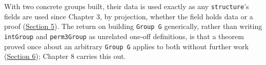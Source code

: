 With two concrete groups built, their data is used exactly as any \texttt{structure}'s fields are used since Chapter 3, by projection, whether the field holds data or a proof (\hyperref[sec:07-groups:05-accessing-fields:1]{Section 5}). The return on building \texttt{Group G} generically, rather than writing \texttt{intGroup} and \texttt{perm3Group} as unrelated one-off definitions, is that a theorem proved once about an arbitrary \texttt{Group G} applies to both without further work (\hyperref[sec:07-groups:06-why-bundle:1]{Section 6}); Chapter 8 carries this out.









